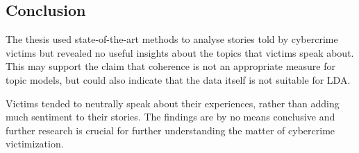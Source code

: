\subsection{Conclusion}

The thesis used state-of-the-art methods to analyse stories told by cybercrime victims but revealed no useful insights about the topics that victims speak about. This may support the claim that coherence is not an appropriate measure for topic models, but could also indicate that the data itself is not suitable for LDA.

Victims tended to neutrally speak about their experiences, rather than adding much sentiment to their stories. The findings are by no means conclusive and further research is crucial for further understanding the matter of cybercrime victimization.

